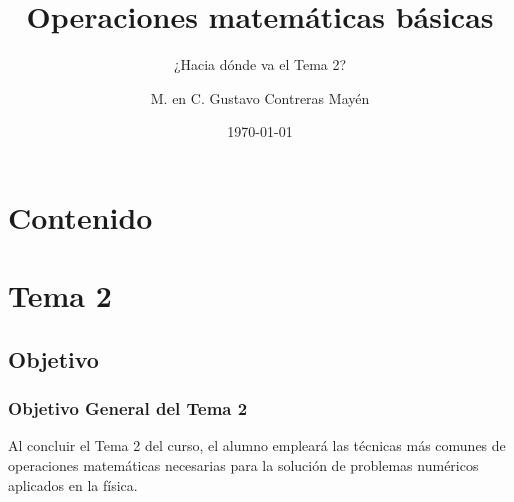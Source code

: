 



\makeatletter
\def\maketag@@@#1{\hbox{\m@th\normalfont\small#1}}
\makeatother
\title{\large{Operaciones matemáticas básicas}}
\subtitle{¿Hacia dónde va el Tema 2?}
\author{M. en C. Gustavo Contreras Mayén}
\date{\today}

\maketitle
\fontsize{14}{14}\selectfont
{}
\section*{Contenido}
\section{Tema 2}
\subsection{Objetivo}
\begin{frame}
\frametitle{Objetivo General del Tema 2}
Al concluir el Tema 2 del curso, el alumno empleará las técnicas más comunes de operaciones matemáticas necesarias para la solución de problemas numéricos aplicados en la física.
\end{frame}
